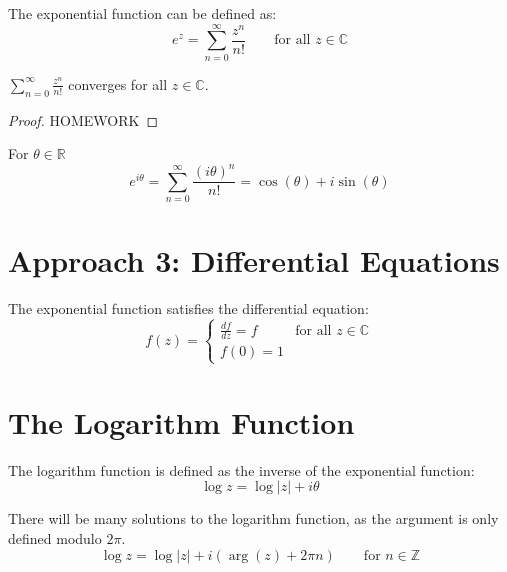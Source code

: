 \begin{definition}
    The exponential function can be defined as:
    \begin{equation}
        e^z = \sum_{n=0}^{\infty} \frac{z^n}{n!} \qquad \text{for all } z \in \mathbb{C}
    \end{equation}
\end{definition}

\begin{claim}
    $\sum_{n=0}^{\infty} \frac{z^n}{n!}$ converges for all $z \in \mathbb{C}$.
\end{claim}
\begin{proof}
    HOMEWORK
\end{proof}

\begin{problem}
For $\theta \in \mathbb{R}$
\[
    e^{i\theta} = \sum_{n=0}^{\infty} \frac{(i\theta)^n}{n!} = \cos(\theta) + i \sin(\theta)
\]
\end{problem}

\section{Approach 3: Differential Equations}
\begin{definition}
    The exponential function satisfies the differential equation:
    \begin{equation}
        f(z) = \begin{cases}
            \frac{df}{dz} = f & \text{for all } z \in \mathbb{C} \\
            f(0) = 1
        \end{cases}
    \end{equation}
\end{definition}

\section{The Logarithm Function}
\begin{definition}
    The logarithm function is defined as the inverse of the exponential function:
    \begin{equation}
        \log z = \log |z| + i \theta
    \end{equation}
\end{definition}
\begin{remark}
    There will be many solutions to the logarithm function, as the argument is only defined modulo \(2\pi\).
    \[
        \log z = \log |z| + i \left( \arg(z) + 2\pi n \right) \qquad \text{for } n \in \mathbb{Z}
    \]
\end{remark}


